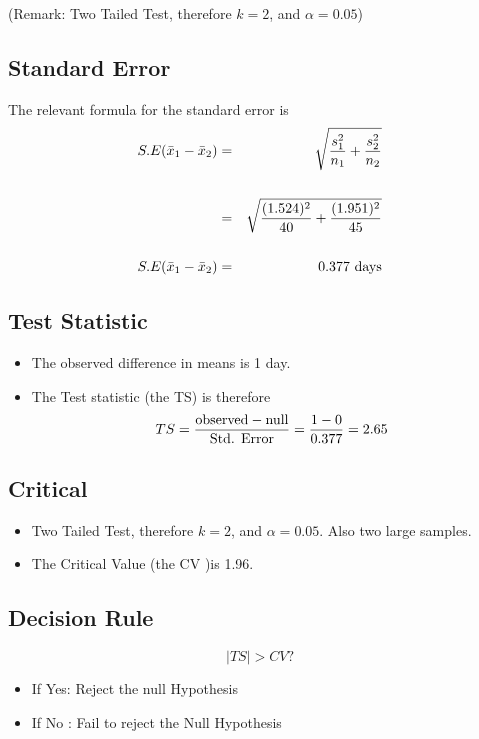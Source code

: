 \documentclass[a4paper,12pt]{article}
\begin{document}
(Remark: Two Tailed Test, therefore $k = 2$, and $\alpha = 0.05$)
\medskip


\subsection*{Standard Error}
The relevant formula for the standard error is
\begin{eqnarray*}
S.E(\bar{x}_1 - \bar{x}_2) &=& \sqrt{{s^2_1\over n_1}+{s^2_2 \over n_2}} \\
& & \\
&=& \sqrt{{(1.524)^2 \over 40}+{(1.951)^2 \over 45}}   \\
& & \\
S.E(\bar{x}_1 - \bar{x}_2)
&=& 0.377\mbox{ days}\\
\end{eqnarray*}
\medskip
\subsection*{Test Statistic}
\begin{itemize}
\item The observed difference in means is 1 day.
\item The Test statistic (the TS) is therefore
\[ TS = {\mbox{observed} - \mbox{null} \over \mbox{Std. Error}}  = {1 - 0 \over 0.377 } = 2.65 \]

\end{itemize}

\medskip 

\subsection*{Critical}
\begin{itemize}
\item Two Tailed Test, therefore $k = 2$, and $\alpha = 0.05$. Also two large samples. 
\item The Critical Value (the CV )is 1.96.
\end{itemize}
\medskip


\subsection*{Decision Rule}

\begin{framed}
\[ |TS| > CV ?  \]
\begin{itemize}
\item If Yes: Reject the null Hypothesis
\item If No : Fail to reject the Null Hypothesis
\end{itemize}
\end{framed}
\end{document}
